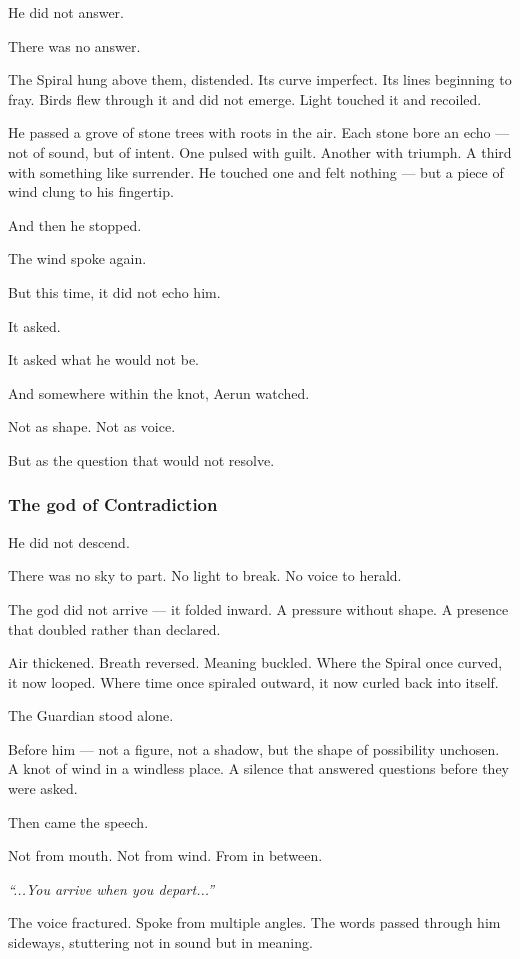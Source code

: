 \documentclass[12pt]{article}
\begin{document}
He did not answer.

There was no answer.

The Spiral hung above them, distended. Its curve imperfect. Its lines beginning to fray. Birds flew through it and did not emerge. Light touched it and recoiled.

He passed a grove of stone trees with roots in the air. Each stone bore an echo — not of sound, but of intent. One pulsed with guilt. Another with triumph. A third with something like surrender. He touched one and felt nothing — but a piece of wind clung to his fingertip.

And then he stopped.

The wind spoke again.

But this time, it did not echo him.

It asked.

It asked what he would not be.

And somewhere within the knot, Aerun watched.

Not as shape. Not as voice.

But as the question that would not resolve.

\dotfill

\subsubsection*{The god of Contradiction}

He did not descend.

There was no sky to part. No light to break. No voice to herald.

The god did not arrive — it folded inward. A pressure without shape. A presence that doubled rather than declared.

Air thickened. Breath reversed. Meaning buckled. Where the Spiral once curved, it now looped. Where time once spiraled outward, it now curled back into itself.

The Guardian stood alone.

Before him — not a figure, not a shadow, but the shape of possibility unchosen. A knot of wind in a windless place. A silence that answered questions before they were asked.

Then came the speech.

Not from mouth. Not from wind. From in between.

\textit{“...You arrive when you depart...”}

The voice fractured. Spoke from multiple angles. The words passed through him sideways, stuttering not in sound but in meaning.
\end{document}
